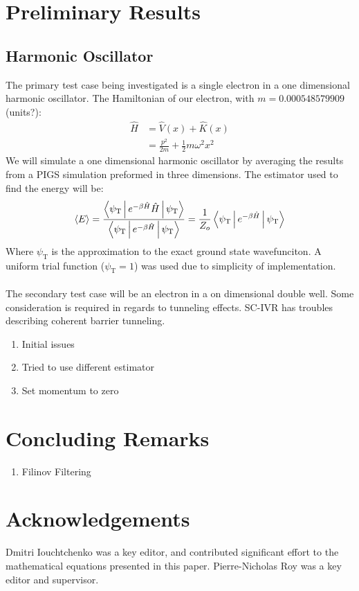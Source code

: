 \documentclass[12pt,letterpaper,oneside,final,titlepage]{article}               %
\numberwithin{equation}{section} %
\newcommand{\psiT}{\psi_{\textrm{T}}}
\begin{document}
\section{Preliminary Results}

\subsection*{Harmonic Oscillator}
The primary test case being investigated is a single electron in a one dimensional harmonic oscillator. 
The Hamiltonian of our electron, with $m = \num{0.000548579909}$ (units?): 
\begin{align}
    \hat{H} &= \hat{V}(x) + \hat{K}(x) \\
            &= \frac{p^2}{2m} + \frac{1}{2} m \omega^{2} x^{2} 
\end{align}
We will simulate a one dimensional harmonic oscillator by averaging the results from a PIGS simulation preformed in three dimensions. 
The estimator used to find the energy will be:
\begin{equation}
    \Braket{E} = \frac{\Braket{\psiT|e^{-\beta\hat{H}}\hat{H}|\psiT}}{\Braket{\psiT|e^{-\beta\hat{H}}|\psiT}} = \frac{1}{Z_{o}} \Braket{\psiT|e^{-\beta\hat{H}}|\psiT}
\end{equation}
Where $\psiT$ is the approximation to the exact ground state wavefunciton. A uniform trial function ($\psiT = 1$) was used due to simplicity of implementation.
\\ \\
The secondary test case will be an electron in a on dimensional double well. Some consideration is required in regards to tunneling effects. SC-IVR has troubles describing coherent barrier tunneling.

\begin{enumerate}
    \item Initial issues
    \item Tried to use different estimator
    \item Set momentum to zero
\end{enumerate}

\section{Concluding Remarks}
\begin{enumerate}
    \item Filinov Filtering
\end{enumerate}


\section{Acknowledgements}
Dmitri Iouchtchenko was a key editor, and contributed significant effort to the mathematical equations presented in this paper. 
Pierre-Nicholas Roy was a key editor and supervisor.

\renewcommand*{\bibfont}{\scriptsize}
\printbibliography
\end{document}
